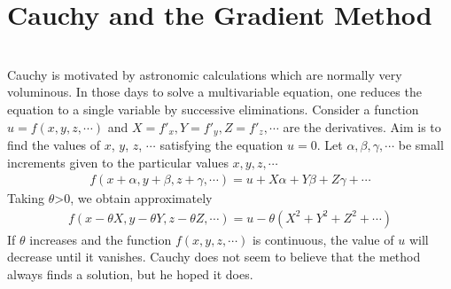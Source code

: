 \documentclass{article}
\begin{document}
\section{Cauchy and the Gradient Method}
\begin{paragraph}
\\
Cauchy is motivated by astronomic calculations which are normally very voluminous. In those days to solve a multivariable equation, one reduces the equation to a single variable by successive eliminations. Consider a function $u = f(x,y,z,\cdots)$ and $X = f'_x, Y = f'_y, Z = f'_z,\cdots$ are the derivatives. Aim is to find the values of $x$, $y$, $z$, $\cdots$ satisfying the equation $u = 0$. Let $\alpha, \beta, \gamma, \cdots$ be small increments given to the particular values $x, y, z, \cdots$
\begin{align*}
    f(x + \alpha, y + \beta, z + \gamma, \cdots) = u + X\alpha + Y\beta + Z\gamma + \cdots 
\end{align*}
Taking $\theta$>0, we obtain approximately
\begin{align*}
    f(x - \theta X, y - \theta Y, z - \theta Z, \cdots) = u - \theta(X^2 + Y^2 +Z^2 + \cdots)
\end{align*}
If $\theta$ increases and the function $f(x, y, z, \cdots)$ is continuous, the value of $u$ will decrease until it vanishes. Cauchy does not seem to believe that the method always finds a solution, but he hoped it does.
\end{paragraph}
\end{document}
